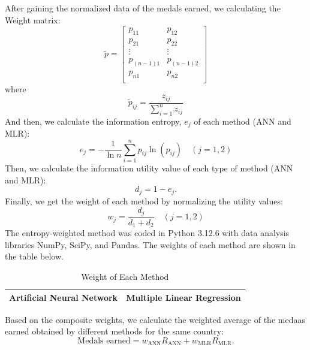 \documentclass{mcmthesis}
\begin{document}
After gaining the normalized data of the medals earned, we calculating the Weight matrix:
\begin{equation}\label{eq:3}
\tilde{p}= 
\begin{bmatrix}
	p_{11}&		p_{12}\\
	p_{21}&		p_{22}\\
	\vdots&		\vdots\\
	p_{(n-1) 1}&		p_{\left( n-1 \right) 2}\\
	p_{n1}&		p_{n2}\\
\end{bmatrix}
\end{equation}
where
\begin{equation}\label{eq:1}
\tilde{p}_{ij}=\frac{z_{ij}}{\sum_{i=1}^n z_{ij}}
\end{equation}
And then, we calculate the information entropy, $e_j$ of each method (ANN and MLR):
\begin{equation}\label{eq:1}
e_j=-\frac{1}{\ln n}\sum_{i=1}^n p_{ij}\ln (p_{ij}) \quad \left( j=1,2 \right)  
\end{equation}
Then, we calculate the information utility value of each type of method (ANN and MLR):
\begin{equation}\label{eq:1}
d_j=1-e_j.  
\end{equation}
Finally, we get the weight of each method by normalizing the utility values:
\begin{equation}\label{eq:1}
w_j=\frac{d_j}{d_1+d_2} \quad (j=1,2)
\end{equation}
The entropy-weighted method was coded in Python 3.12.6 with data analysis libraries NumPy, SciPy, and Pandas. The weights of each method are shown in the table below.
\begin{table}[H]
\centering 
\label{B}
\caption{Weight of Each Method}
\vspace{5pt}
\begin{tabularx}{\textwidth} {
  >{\raggedright\arraybackslash}X 
  >{\raggedright\arraybackslash}X  }
\hline
\textbf{Artificial Neural Network} & \textbf{Multiple Linear Regression} \\
\hline\hline
\end{tabularx}
\end{table}
Based on the composite weights, we calculate the weighted average of the medaas earned obtained by different methods for the same country:
\begin{equation}\label{eq:1}
\text{Medals earned} = w_\text{ANN}R_\text{ANN} + w_\text{MLR}R_\text{MLR}.
\end{equation}
\end{document}
